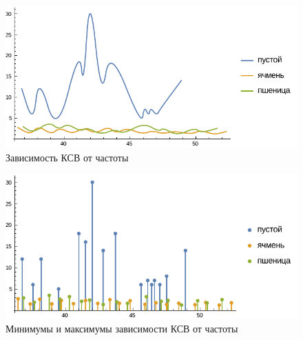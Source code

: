 \documentclass[a4paper]{hedwork}
\begin{document}
    \begin{figure}[H!]
        \center
        \includegraphics[width=.9\textwidth]{plot1}
        \caption{Зависимость КСВ от частоты}
    \end{figure}

    \begin{figure}[H!]
        \center
        \includegraphics[width=.9\textwidth]{plot2}
        \caption{Минимумы и максимумы зависимости КСВ от частоты}
    \end{figure}
\end{document}
